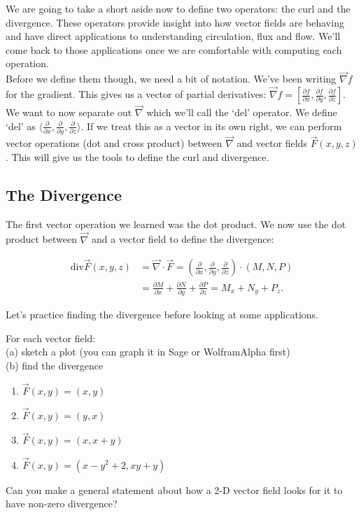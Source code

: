 We are going to take a short aside now to define two operators: the curl and the divergence. These operators provide insight into how vector fields are behaving and have direct applications to understanding circulation, flux and flow. We'll come back to those applications once we are comfortable with computing each operation.\\

Before we define them though, we need a bit of notation. We've been writing $\vec \nabla f$ for the gradient. This gives us a vector of partial derivatives:  $\vec \nabla f= \left[ \frac{\partial f}{\partial x},\frac{\partial f}{\partial y},\frac{\partial f}{\partial z}\right]$. We want to now separate out $\vec \nabla$ which we'll call the `del' operator. We define `del' as $\langle \frac{\partial}{\partial x},\frac{\partial}{\partial y},\frac{\partial}{\partial z}\rangle$. If we treat this as a vector in its own right, we can perform vector operations (dot and cross product) between $\vec \nabla$ and vector fields $\vec{F}(x,y,z)$. This will give us the tools to define the curl and divergence.

\subsection{The Divergence}
The first vector operation we learned was the dot product. We now use the dot product between $\vec \nabla$ and a vector field to define the divergence:

\begin{align*}
\text{div}\vec F(x,y,z) 
&= \vec \nabla\cdot \vec F 
= \left(\frac{\partial }{\partial x},\frac{\partial }{\partial y},\frac{\partial }{\partial z} \right)\cdot (M,N,P) \\
&= \frac{\partial M}{\partial x}+\frac{\partial N}{\partial y}+\frac{\partial P}{\partial z} 
= M_x+N_y+P_z 
.
\end{align*}

Let's practice finding the divergence before looking at some applications.

\begin{problem}\label{2d_div}
\vskip0.1in
For each vector field: \\
(a) sketch a plot (you can graph it in Sage or WolframAlpha first) \\
(b) find the divergence \\
[Suggestion: Leave space after each sub-exercise for another computation (the curl).]
\begin{enumerate}
\item $\vec{F}(x,y)=(x,y)$
\item $\vec{F}(x,y)=(y,x)$
\item $\vec{F}(x,y)=(x,x+y)$
\item $\vec{F}(x,y)=(x-y^2+2, xy+y)$
\end{enumerate}
Can you make a general statement about how a 2-D vector field looks for it to have non-zero divergence?
\end{problem}

